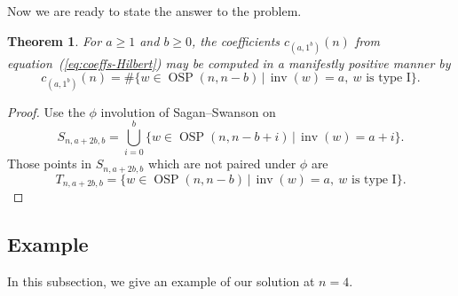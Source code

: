 \documentclass[11pt]{amsart}
\newtheorem{theorem}{Theorem}
\theoremstyle{definition}
\newcommand{\0}{\emptyset}
\DeclareMathOperator{\OSP}{OSP}
\DeclareMathOperator{\inv}{inv}
\begin{document}
Now we are ready to state the answer to the problem.

\begin{theorem}\label{thm:improved-coefficient-formula}
        For $a \geq 1$ and $b \geq 0$, the coefficients $c_{(a,1^b)}(n)$ from equation~(\ref{eq:coeffs-Hilbert}) may be computed in a manifestly positive manner by
    \begin{equation}\label{eq:second-formula-coeffs}
        c_{(a,1^b)}(n) = \#\{w \in \OSP(n,n-b)\, | \, \inv(w) = a,\ w \text{ is type I} \}.
    \end{equation}
\end{theorem}

\begin{proof}
    
Use the $\phi$ involution of Sagan--Swanson on 
\begin{equation}
S_{n,a+2b,b} = \bigcup_{i=0}^b \{ w\in \OSP(n,n-b+i)\, | \, \inv(w) = a+i\}.   
\end{equation}
Those points in $S_{n,a+2b,b}$ which are not paired under $\phi$ are
\begin{equation}
    T_{n,a+2b,b} = \{w \in \OSP(n,n-b)\, | \, \inv(w) = a, \ w \text{ is type I} \}.
\end{equation}
\end{proof}

\subsection{Example}
In this subsection, we give an example of our solution at $n=4$.
\end{document}
